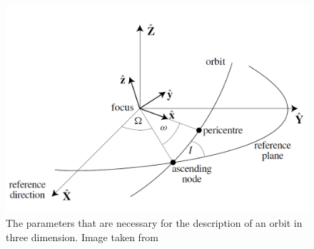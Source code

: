 \documentclass[12pt,%
               a4paper,%
               oneside,openany,%
               titlepage,%
               headinclude,footinclude,%
               BCOR5mm,%
               cleardoublepage=empty,%
               tablecaptionabove,%
               floatperchapter,
               ]{scrreprt}                 %
\begin{document}
\begin{figure}[h]
\begin{center}
\includegraphics[width=1\textwidth]{Figures/Inclination.png}
\caption{The parameters that are necessary for the description of an orbit in three dimension. Image taken from \cite{murray1999solar}}
\label{Inclination}
\end{center}
\end{figure}








\newpage



\end{document}

